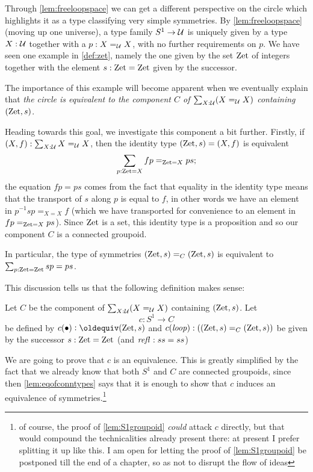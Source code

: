 \begin{remark}
  Through \cref{lem:freeloopspace} we can get a different perspective on the circle which highlights it as a type classifying very simple symmetries.
By \cref{lem:freeloopspace} (moving up one universe), a type family $S^1\to\mathcal{U}$ is uniquely given by a type $X:\mathcal{U}$ together with a $p:X=_{\mathcal{U}} X$, with no further requirements on $p$.  We have seen one example in \cref{def:zet}, namely the one given by the set $\mathrm{Zet}$ of integers together with the element $s:\mathrm{Zet}=\mathrm{Zet}$ given by the successor.  

The importance of this example will become apparent when we eventually explain that \emph{the circle is equivalent to the component $C$ of $\sum_{X:\mathcal{U}}(X=_{\mathcal{U}}X)$ containing $(\mathrm{Zet},s)$}. 

Heading towards this goal, we investigate this component a bit further.  Firstly, if $(X,f):\sum_{X:\mathcal{U}}X=_{\mathcal{U}}X$, then the identity type $(\mathrm{Zet},s)=(X,f)$ is equivalent
$$\sum_{p:\mathrm{Zet}=X}fp=_{\mathrm{Zet}=X}ps;$$ the equation $fp=ps$ comes from the fact that equality in the identity type means that the transport of $s$ along $p$ is equal to $f$, in other words we have an element in $p^{-1}sp=_{X=X}f$ (which we have transported for convenience to an element in $fp=_{\mathrm{Zet}=X}ps$).  Since $\mathrm{Zet}$ is a set, this identity type is a proposition and so our component $C$ is a connected groupoid.  

In particular, the type of symmetries $(\mathrm{Zet},s)=_C(\mathrm{Zet},s)$ is equivalent to $\sum_{p:\mathrm{Zet}=\mathrm{Zet}}sp=ps$.  

This discussion tells us that the following definition makes sense:

\begin{definition}\label{def:S1toC}
  Let $C$ be the component of $\sum_{X:\mathcal{U}}(X=_{\mathcal{U}}X)$ containing $(\mathrm{Zet},s)$.
  Let $$c:S^1\to C$$ be defined by $c(\base)\defequi (\zet,s)$ and $c(\mathit{loop}):((\mathrm{Zet},s)=_C(\mathrm{Zet},s))$ be given by the successor $s:\mathrm{Zet}=\mathrm{Zet}$ (and $\mathop{{\it refl}_{}}:ss=ss$)
\end{definition}

We are going to prove that $c$ is an equivalence.  This is greatly simplified by the fact that we already know that both $S^1$ and $C$ are connected groupoids, since then \cref{lem:eqofconntypes} says that it is enough to show that $c$ induces an equivalence of symmetries.\footnote{of course, the proof of \cref{lem:S1groupoid} \emph{could} attack $c$ directly, but that would compound the technicalities already present there: at present I prefer splitting it up like this.  I am open for letting the proof of \cref{lem:S1groupoid} be postponed till the end of a chapter, so as not to disrupt the flow of ideas}


\end{remark}
